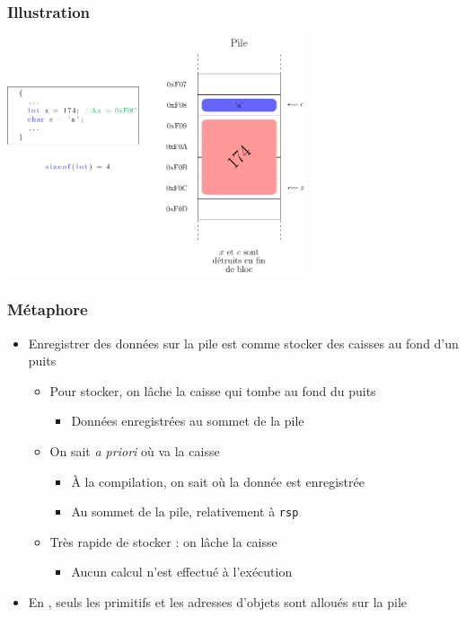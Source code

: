 \begin{frame}
\frametitle{Illustration}
\begin{center}
\includegraphics[height=7cm]{pics/automatic.pdf}
\end{center}
\end{frame}

\begin{frame}
\frametitle{Métaphore}
\begin{itemize}[<+->]
\item Enregistrer des données sur la pile est comme stocker des caisses au fond d'un puits
	\begin{itemize}
	\item Pour stocker, on lâche la caisse qui tombe au fond du puits
		\begin{itemize}
		\item Données enregistrées au sommet de la pile
		\end{itemize}
	\item On sait \emph{a priori} où va la caisse
		\begin{itemize}
		\item À la compilation, on sait où la donnée est enregistrée
		\item Au sommet de la pile, relativement à \texttt{rsp}
		\end{itemize}
	\item Très rapide de stocker : on lâche la caisse
		\begin{itemize}
		\item Aucun calcul n'est effectué à l'exécution
		\end{itemize}
	\end{itemize}
\item En \java, seuls les primitifs et les adresses d'objets sont alloués sur la pile
\end{itemize}
\end{frame}

